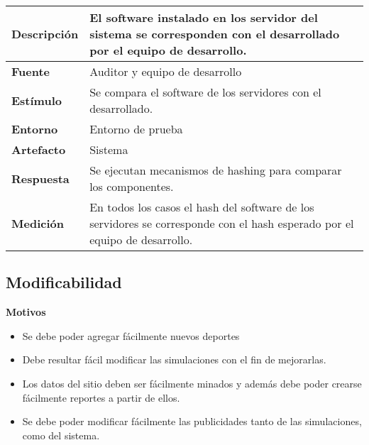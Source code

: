 \begin{center}
  \begin{tabular}{| l | p{10cm} | }
    \hline
	\textbf{Descripción} & El software instalado en los servidor del sistema se corresponden con el desarrollado por el equipo de desarrollo.\\  \hline
	\textbf{Fuente} & Auditor y equipo de desarrollo\\  \hline
	\textbf{Estímulo} & Se compara el software de los servidores con el desarrollado.\\  \hline
	\textbf{Entorno} & Entorno de prueba\\  \hline
	\textbf{Artefacto} & Sistema\\  \hline
	\textbf{Respuesta} & Se ejecutan mecanismos de hashing para comparar los componentes.\\  \hline
	\textbf{Medición} & En todos los casos el hash del software de los servidores se corresponde con el hash esperado por el equipo de desarrollo.\\  \hline
  \end{tabular}
\end{center}  




\subsection{Modificabilidad}
\textbf{Motivos}
\begin{itemize}
\item Se debe poder agregar fácilmente nuevos deportes
\item Debe resultar fácil modificar las simulaciones con el fin de mejorarlas.
\item Los datos del sitio deben ser fácilmente minados y además debe poder crearse fácilmente reportes a partir de ellos.
\item Se debe poder modificar fácilmente las publicidades tanto de las simulaciones, como del sistema.
\end{itemize}

